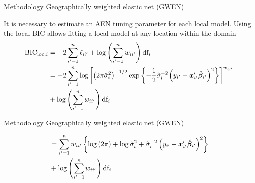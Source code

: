 \documentclass[12pt,t]{beamer}
\newcommand{\subt}[1]{{\footnotesize \color{subtitle} {#1}}}
\begin{document}
\begin{frame}{Methodology}
\subt{Geographically weighted elastic net (GWEN)}

\bigskip
It is necessary to estimate an AEN tuning parameter for each local model. Using the local BIC allows fitting a local model at any location within the domain
	\begin{align}\label{eq:BIC_loc}
		\mbox{BIC}_{\text{loc}, i} &= -2 \sum_{i'=1}^n \ell_{ii'}  + \log \left( \sum_{i'=1}^n w_{ii'} \right) \mbox{df}_i\notag\\
		&= -2 \sum_{i'=1}^n \log \left[ \left(2 \pi \hat{\sigma}_i^2\right)^{-1/2} \exp \left\{-\frac{1}{2} \hat{\sigma}_i^{-2} \left(y_{i'} - \bm{x}_{i'}' \hat{\bm{\beta}}_{i'} \right)^2\right\} \right]^{w_{ii'}} \notag \\
		&+ \log \left( \sum_{i'=1}^n w_{ii'} \right) \mbox{df}_i\notag\\
	\end{align}


\end{frame}







\begin{frame}{Methodology}
\subt{Geographically weighted elastic net (GWEN)}

\bigskip
	\begin{align}
		&= \sum_{i'=1}^n w_{ii'} \left\{ \log \left(2 \pi \right) + \log \hat{\sigma}_i^2 + \hat{\sigma}_i^{-2} \left(y_{i'} - \bm{x}_{i'}' \hat{\bm{\beta}}_{i'} \right)^2 \right\} \notag \\
		&+ \log \left( \sum_{i'=1}^n w_{ii'} \right) \mbox{df}_i \notag
	\end{align}


\end{frame}
\end{document}
